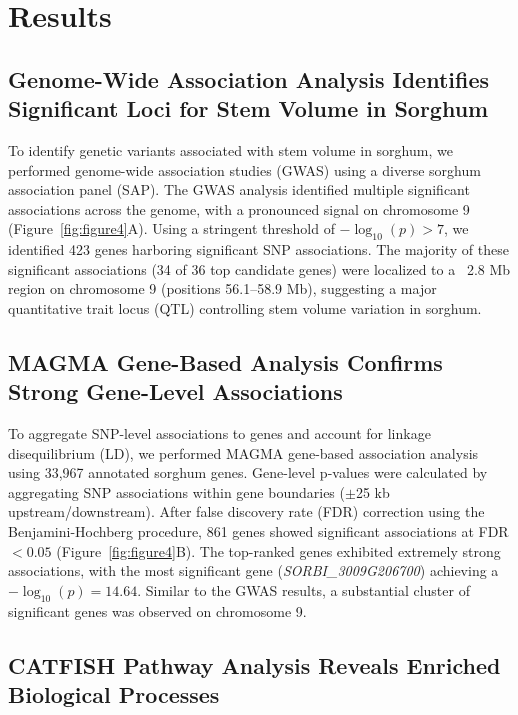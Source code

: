 \documentclass[11pt]{article}
\begin{document}
\section{Results}

\subsection{Genome-Wide Association Analysis Identifies Significant Loci for Stem Volume in Sorghum}

To identify genetic variants associated with stem volume in sorghum, we performed genome-wide association studies (GWAS) using a diverse sorghum association panel (SAP). The GWAS analysis identified multiple significant associations across the genome, with a pronounced signal on chromosome 9 (Figure~\ref{fig:figure4}A). Using a stringent threshold of $-\log_{10}(p) > 7$, we identified 423 genes harboring significant SNP associations. The majority of these significant associations (34 of 36 top candidate genes) were localized to a ~2.8 Mb region on chromosome 9 (positions 56.1--58.9 Mb), suggesting a major quantitative trait locus (QTL) controlling stem volume variation in sorghum.

\subsection{MAGMA Gene-Based Analysis Confirms Strong Gene-Level Associations}

To aggregate SNP-level associations to genes and account for linkage disequilibrium (LD), we performed MAGMA gene-based association analysis using 33,967 annotated sorghum genes. Gene-level p-values were calculated by aggregating SNP associations within gene boundaries ($\pm$25 kb upstream/downstream). After false discovery rate (FDR) correction using the Benjamini-Hochberg procedure, 861 genes showed significant associations at FDR $< 0.05$ (Figure~\ref{fig:figure4}B). The top-ranked genes exhibited extremely strong associations, with the most significant gene (\textit{SORBI\_3009G206700}) achieving a $-\log_{10}(p) = 14.64$. Similar to the GWAS results, a substantial cluster of significant genes was observed on chromosome 9.

\subsection{CATFISH Pathway Analysis Reveals Enriched Biological Processes}
\end{document}
